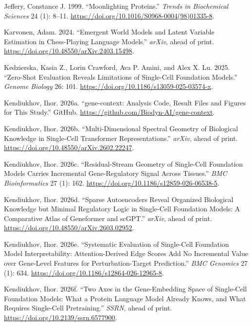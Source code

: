 \documentclass[
  11pt,
]{article}
\newlength{\cslhangindent}
\newenvironment{CSLReferences}[2] %
 {\begin{list}{}{%
  \setlength{\itemindent}{0pt}
  \setlength{\leftmargin}{0pt}
  \setlength{\parsep}{0pt}
  \ifodd #1
   \setlength{\leftmargin}{\cslhangindent}
   \setlength{\itemindent}{-1\cslhangindent}
  \fi
  \setlength{\itemsep}{#2\baselineskip}}}
 {\end{list}}
\begin{document}
\begin{CSLReferences}{1}{1}
Jeffery, Constance J. 1999. {``Moonlighting Proteins.''} \emph{Trends in
Biochemical Sciences} 24 (1): 8--11.
\url{https://doi.org/10.1016/S0968-0004(98)01335-8}.

Karvonen, Adam. 2024. {``Emergent World Models and Latent Variable
Estimation in Chess-Playing Language Models.''} \emph{arXiv}, ahead of
print. \url{https://doi.org/10.48550/arXiv.2403.15498}.

Kedzierska, Kasia Z., Lorin Crawford, Ava P. Amini, and Alex X. Lu.
2025. {``Zero-Shot Evaluation Reveals Limitations of Single-Cell
Foundation Models.''} \emph{Genome Biology} 26: 101.
\url{https://doi.org/10.1186/s13059-025-03574-x}.

Kendiukhov, Ihor. 2026a. {``{gene-context}: Analysis Code, Result Files
and Figures for This Study.''} GitHub.
\url{https://github.com/Biodyn-AI/gene-context}.

Kendiukhov, Ihor. 2026b. {``Multi-Dimensional Spectral Geometry of
Biological Knowledge in Single-Cell Transformer Representations.''}
\emph{arXiv}, ahead of print.
\url{https://doi.org/10.48550/arXiv.2602.22247}.

Kendiukhov, Ihor. 2026c. {``Residual-Stream Geometry of Single-Cell
Foundation Models Carries Incremental Gene-Regulatory Signal Across
Tissues.''} \emph{BMC Bioinformatics} 27 (1): 162.
\url{https://doi.org/10.1186/s12859-026-06538-5}.

Kendiukhov, Ihor. 2026d. {``Sparse Autoencoders Reveal Organized
Biological Knowledge but Minimal Regulatory Logic in Single-Cell
Foundation Models: A Comparative Atlas of {Geneformer} and {scGPT}.''}
\emph{arXiv}, ahead of print.
\url{https://doi.org/10.48550/arXiv.2603.02952}.

Kendiukhov, Ihor. 2026e. {``Systematic Evaluation of Single-Cell
Foundation Model Interpretability: Attention-Derived Edge Scores Add No
Incremental Value over Gene-Level Features for Perturbation-Target
Prediction.''} \emph{BMC Genomics} 27 (1): 634.
\url{https://doi.org/10.1186/s12864-026-12965-8}.

Kendiukhov, Ihor. 2026f. {``Two Axes in the Gene-Embedding Space of
Single-Cell Foundation Models: What a Protein Language Model Already
Knows, and What Requires Single-Cell Pretraining.''} \emph{SSRN}, ahead
of print. \url{https://doi.org/10.2139/ssrn.6577900}.


\end{CSLReferences}
\end{document}
